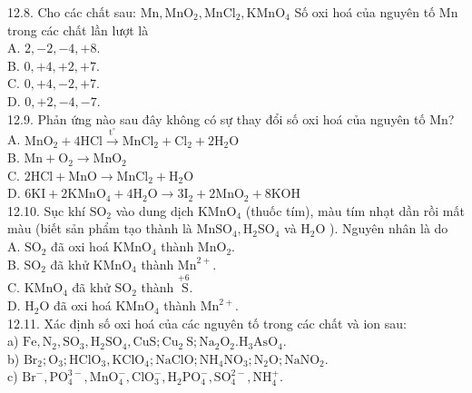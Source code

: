 \documentclass[10pt]{article}
\begin{document}
12.8. Cho các chất sau: $\mathrm{Mn}, \mathrm{MnO}_{2}, \mathrm{MnCl}_{2}, \mathrm{KMnO}_{4}$ Số oxi hoá của nguyên tố Mn trong các chất lần lượt là\\
A. $2,-2,-4,+8$.\\
B. $0,+4,+2,+7$.\\
C. $0,+4,-2,+7$.\\
D. $0,+2,-4,-7$.\\
12.9. Phản ứng nào sau đây không có sự thay đổi số oxi hoá của nguyên tố Mn?\\
A. $\mathrm{MnO}_{2}+4 \mathrm{HCl} \xrightarrow{\mathrm{t}^{\circ}} \mathrm{MnCl}_{2}+\mathrm{Cl}_{2}+2 \mathrm{H}_{2} \mathrm{O}$\\
B. $\mathrm{Mn}+\mathrm{O}_{2} \rightarrow \mathrm{MnO}_{2}$\\
C. $2 \mathrm{HCl}+\mathrm{MnO} \rightarrow \mathrm{MnCl}_{2}+\mathrm{H}_{2} \mathrm{O}$\\
D. $6 \mathrm{KI}+2 \mathrm{KMnO}_{4}+4 \mathrm{H}_{2} \mathrm{O} \rightarrow 3 \mathrm{I}_{2}+2 \mathrm{MnO}_{2}+8 \mathrm{KOH}$\\
12.10. Sục khí $\mathrm{SO}_{2}$ vào dung dịch $\mathrm{KMnO}_{4}$ (thuốc tím), màu tím nhạt dần rồi mất màu (biết sản phẩm tạo thành là $\mathrm{MnSO}_{4}, \mathrm{H}_{2} \mathrm{SO}_{4}$ và $\mathrm{H}_{2} \mathrm{O}$ ). Nguyên nhân là do\\
A. $\mathrm{SO}_{2}$ đã oxi hoá $\mathrm{KMnO}_{4}$ thành $\mathrm{MnO}_{2}$.\\
B. $\mathrm{SO}_{2}$ đã khử $\mathrm{KMnO}_{4}$ thành $\mathrm{Mn}^{2+}$.\\
C. $\mathrm{KMnO}_{4}$ đã khử $\mathrm{SO}_{2}$ thành $\stackrel{+6}{\mathrm{~S}}$.\\
D. $\mathrm{H}_{2} \mathrm{O}$ đã oxi hoá $\mathrm{KMnO}_{4}$ thành $\mathrm{Mn}^{2+}$.\\
12.11. Xác định số oxi hoá của các nguyên tố trong các chất và ion sau:\\
a) $\mathrm{Fe}, \mathrm{N}_{2}, \mathrm{SO}_{3}, \mathrm{H}_{2} \mathrm{SO}_{4}, \mathrm{CuS} ; \mathrm{Cu}_{2} \mathrm{~S} ; \mathrm{Na}_{2} \mathrm{O}_{2} . \mathrm{H}_{3} \mathrm{AsO}_{4}$.\\
b) $\mathrm{Br}_{2} ; \mathrm{O}_{3} ; \mathrm{HClO}_{3}, \mathrm{KClO}_{4} ; \mathrm{NaClO} ; \mathrm{NH}_{4} \mathrm{NO}_{3} ; \mathrm{N}_{2} \mathrm{O} ; \mathrm{NaNO}_{2}$.\\
c) $\mathrm{Br}^{-}, \mathrm{PO}_{4}^{3-}, \mathrm{MnO}_{4}^{-}, \mathrm{ClO}_{3}^{-}, \mathrm{H}_{2} \mathrm{PO}_{4}^{-}, \mathrm{SO}_{4}^{2-}, \mathrm{NH}_{4}^{+}$.\\
\end{document}

